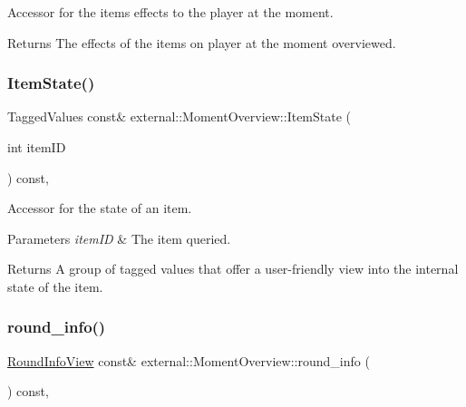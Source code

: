 Accessor for the items\textquotesingle{} effects to the player at the moment. 

\begin{DoxyReturn}{Returns}
The effects of the items on player at the moment overviewed. 
\end{DoxyReturn}
\mbox{\label{classexternal_1_1_moment_overview_a7b4fcaf0941014e26c847fb6dad5912c}} 
\subsubsection{\texorpdfstring{Item\+State()}{ItemState()}}
{\footnotesize\ttfamily Tagged\+Values const\& external\+::\+Moment\+Overview\+::\+Item\+State (\begin{DoxyParamCaption}\item[{int}]{item\+ID }\end{DoxyParamCaption}) const\hspace{0.3cm}{\ttfamily [inline]}, {\ttfamily [noexcept]}}



Accessor for the state of an item. 


\begin{DoxyParams}{Parameters}
{\em item\+ID} & The item queried. \\
\hline
\end{DoxyParams}
\begin{DoxyReturn}{Returns}
A group of tagged values that offer a user-\/friendly view into the internal state of the item. 
\end{DoxyReturn}
\mbox{\label{classexternal_1_1_moment_overview_a186a205fd74b30b627b82bf837b78f79}} 
\subsubsection{\texorpdfstring{round\+\_\+info()}{round\_info()}}
{\footnotesize\ttfamily \hyperlink{classroundinfo_1_1_round_info_view}{Round\+Info\+View} const\& external\+::\+Moment\+Overview\+::round\+\_\+info (\begin{DoxyParamCaption}{ }\end{DoxyParamCaption}) const\hspace{0.3cm}{\ttfamily [inline]}, {\ttfamily [noexcept]}}



